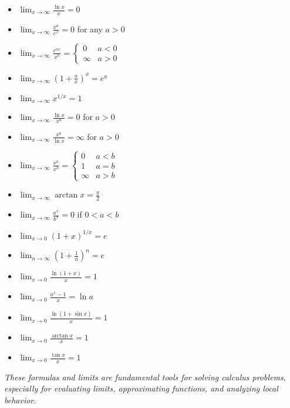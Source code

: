 \begin{cascade}
	\begin{itemize}
		\item $\displaystyle \lim_{x \to \infty} \frac{\ln x}{x} = 0$
		\item $\displaystyle \lim_{x \to \infty} \frac{x^a}{e^x} = 0$ for any $a > 0$
		\item $\displaystyle \lim_{x \to \infty} \frac{e^{ax}}{x^b} = \begin{cases}
				      0      & a < 0 \\
				      \infty & a > 0
			      \end{cases}$
		\item $\displaystyle \lim_{x \to \infty} \left(1 + \frac{a}{x}\right)^x = e^a$
		\item $\displaystyle \lim_{x \to \infty} x^{1/x} = 1$
		\item $\displaystyle \lim_{x \to \infty} \frac{\ln x}{x^a} = 0$ for $a > 0$
		\item $\displaystyle \lim_{x \to \infty} \frac{x^a}{\ln x} = \infty$ for $a > 0$
		\item $\displaystyle \lim_{x \to \infty} \frac{x^a}{x^b} = \begin{cases}
				      0      & a < b \\
				      1      & a = b \\
				      \infty & a > b
			      \end{cases}$
		\item $\displaystyle \lim_{x \to \infty} \arctan x = \frac{\pi}{2}$
		\item $\displaystyle \lim_{x \to \infty} \frac{a^x}{b^x} = 0$ if $0 < a < b$
	\end{itemize}
\end{cascade}

\begin{cascade}
	\begin{itemize}
		\item $\displaystyle \lim_{x \to 0} (1 + x)^{1/x} = e$
		\item $\displaystyle \lim_{n \to \infty} \left(1 + \frac{1}{n}\right)^n = e$
		\item $\displaystyle \lim_{x \to 0} \frac{\ln(1+x)}{x} = 1$
		\item $\displaystyle \lim_{x \to 0} \frac{a^x - 1}{x} = \ln a$
		\item $\displaystyle \lim_{x \to 0} \frac{\ln(1+\sin x)}{x} = 1$
		\item $\displaystyle \lim_{x \to 0} \frac{\arctan x}{x} = 1$
		\item $\displaystyle \lim_{x \to 0} \frac{\tan x}{x} = 1$
	\end{itemize}
\end{cascade}

\hfill

\textit{These formulas and limits are fundamental tools for solving calculus problems, especially for evaluating limits, approximating functions, and analyzing local behavior.}
